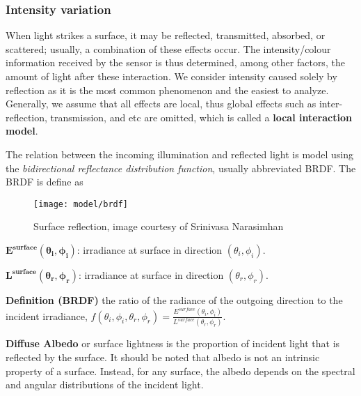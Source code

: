 \subsubsection{Intensity variation}
When light strikes a surface, it may be reflected, transmitted, absorbed, or scattered; usually, a combination of these effects occur. The intensity/colour information received by the sensor is thus determined, among other factors, the amount of light after these interaction. We consider intensity caused solely by reflection as it is the most common phenomenon and the easiest to analyze. Generally, we assume that all effects are local, thus global effects such as inter-reflection, transmission, and etc are omitted, which is called a \textbf{local interaction model}. 

The relation between the incoming illumination and reflected light is model using the \textit{bidirectional reflectance distribution function}, usually abbreviated BRDF. The BRDF is define as
\begin{figure}[h]
\centering
\texttt{[image: model/brdf]}
\caption{Surface reflection, image courtesy of Srinivasa Narasimhan}
\end{figure}

$\mathbf{E^{surface}(\theta_i, \phi_i)}$: irradiance at surface in direction $(\theta_i, \phi_i)$.

$\mathbf{L^{surface}(\theta_r, \phi_r)}$: irradiance at surface in direction $(\theta_r, \phi_r)$.

\textbf{Definition (BRDF)} the ratio of the radiance of the outgoing direction to the incident irradiance, \ie $f(\theta_i, \phi_i, \theta_r, \phi_r)=\frac{E^{surface}(\theta_i, \phi_i)}{L^{surface}(\theta_r, \phi_r)}$.

\textbf{Diffuse Albedo} or surface lightness is the proportion of incident light that is reflected by the surface. It should be noted that albedo is not an intrinsic property of a surface. Instead, for any surface, the albedo depends on the spectral and angular distributions of the incident light. 

